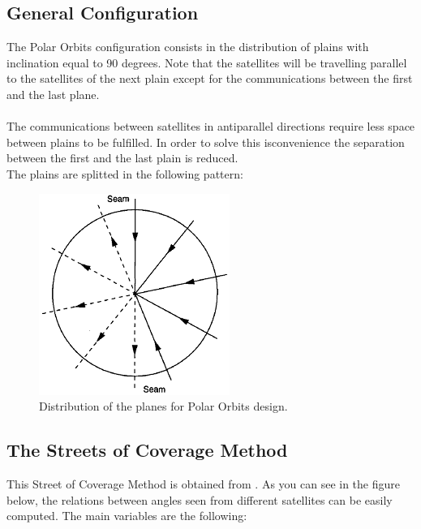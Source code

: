 \subsection{General Configuration}
The Polar Orbits configuration consists in the distribution of plains with inclination equal to 90 degrees. Note that the satellites will be travelling parallel to the satellites of the next plain except for the communications between the first and the last plane. 
\\
\\
The communications between satellites in antiparallel directions require less space between plains to be fulfilled. In order to solve this isconvenience the separation between the first and the last plain is reduced.
\\
The plains are splitted in the following pattern:

\begin{figure}[H]
\begin{center}
\includegraphics[scale=0.6]{PolarOrbits/planeconfig.png}
\caption{Distribution of the planes for Polar Orbits design.}
\end{center}
\end{figure}

\subsection{The Streets of Coverage Method}
This  Street of Coverage Method is obtained from 
\cite{Chobotov2002}. As you can see in the figure below,
 the relations between angles seen from different satellites can
 be easily computed. The main variables are the following:

